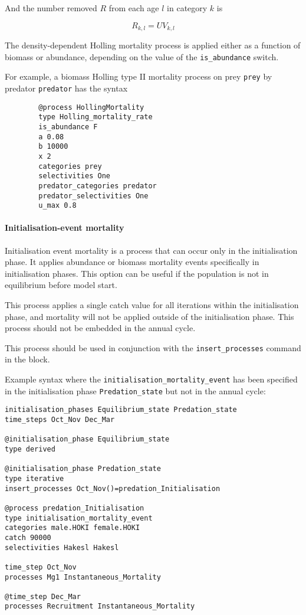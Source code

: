 And the number removed $R$ from each age $l$ in category $k$ is

\begin{equation}
	R_{k,l} = U V_{k,l}
\end{equation}

The density-dependent Holling mortality process is applied either as a function of biomass or abundance, depending on the value of the \texttt{is\_abundance} switch.

For example, a biomass Holling type II mortality process on prey \texttt{prey} by predator \texttt{predator} has the syntax

{\small{\begin{verbatim}
		@process HollingMortality
		type Holling_mortality_rate
		is_abundance F
		a 0.08
		b 10000
		x 2
		categories prey
		selectivities One
		predator_categories predator
		predator_selectivities One
		u_max 0.8
\end{verbatim}}}

\paragraph{Initialisation-event mortality}\label{sec:Process-MortalityInitialisationEvent}\label{sec:Process-MortalityInitialisationEventBiomass}

Initialisation event mortality is a process that can occur only in the initialisation phase. It applies abundance or biomass mortality events specifically in initialisation phases. This option can be useful if the population is not in equilibrium before model start.

This process applies a single catch value for all iterations within the initialisation phase, and mortality will not be applied outside of the initialisation phase. This process should not be embedded in the annual cycle.

This process should be used in conjunction with the \texttt{insert\_processes} command in the  block.

Example syntax where the \texttt{initialisation\_mortality\_event} has been specified in the initialisation phase \texttt{Predation\_state} but not in the annual cycle:

{\small{\begin{verbatim}
initialisation_phases Equilibrium_state Predation_state
time_steps Oct_Nov Dec_Mar

@initialisation_phase Equilibrium_state
type derived

@initialisation_phase Predation_state
type iterative
insert_processes Oct_Nov()=predation_Initialisation

@process predation_Initialisation
type initialisation_mortality_event
categories male.HOKI female.HOKI
catch 90000
selectivities Hakesl Hakesl

time_step Oct_Nov
processes Mg1 Instantaneous_Mortality

@time_step Dec_Mar
processes Recruitment Instantaneous_Mortality
\end{verbatim}}}

